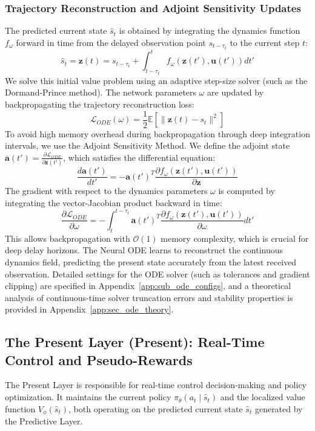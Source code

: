\documentclass[manuscript, screen, review]{jair}
\begin{document}
\subsubsection{Trajectory Reconstruction and Adjoint Sensitivity Updates}
The predicted current state $\hat{s}_t$ is obtained by integrating the dynamics function $f_\omega$ forward in time from the delayed observation point $s_{t-\tau_t}$ to the current step $t$:
\begin{equation}
    \hat{s}_t = \mathbf{z}(t) = s_{t-\tau_t} + \int_{t-\tau_t}^{t} f_\omega(\mathbf{z}(t'), \mathbf{u}(t')) dt'
\end{equation}
We solve this initial value problem using an adaptive step-size solver (such as the Dormand-Prince method). The network parameters $\omega$ are updated by backpropagating the trajectory reconstruction loss:
\begin{equation}
    \mathcal{L}_{ODE}(\omega) = \frac{1}{2} \mathbb{E} \left[ \| \mathbf{z}(t) - s_t \|^2 \right]
\end{equation}
To avoid high memory overhead during backpropagation through deep integration intervals, we use the Adjoint Sensitivity Method. We define the adjoint state $\mathbf{a}(t') = \frac{\partial \mathcal{L}_{ODE}}{\partial \mathbf{z}(t')}$, which satisfies the differential equation:
\begin{equation}
    \frac{d\mathbf{a}(t')}{dt'} = - \mathbf{a}(t')^T \frac{\partial f_\omega(\mathbf{z}(t'), \mathbf{u}(t'))}{\partial \mathbf{z}}
\end{equation}
The gradient with respect to the dynamics parameters $\omega$ is computed by integrating the vector-Jacobian product backward in time:
\begin{equation}
    \frac{\partial \mathcal{L}_{ODE}}{\partial \omega} = - \int_{t}^{t-\tau_t} \mathbf{a}(t')^T \frac{\partial f_\omega(\mathbf{z}(t'), \mathbf{u}(t'))}{\partial \omega} dt'
\end{equation}
This allows backpropagation with $\mathcal{O}(1)$ memory complexity, which is crucial for deep delay horizons. The Neural ODE learns to reconstruct the continuous dynamics field, predicting the present state accurately from the latest received observation. Detailed settings for the ODE solver (such as tolerances and gradient clipping) are specified in Appendix~\ref{app:sub_ode_configs}, and a theoretical analysis of continuous-time solver truncation errors and stability properties is provided in Appendix~\ref{app:sec_ode_theory}.

\subsection{The Present Layer (Present): Real-Time Control and Pseudo-Rewards}
The Present Layer is responsible for real-time control decision-making and policy optimization. It maintains the current policy $\pi_\theta(a_t \mid \hat{s}_t)$ and the localized value function $V_\phi(\hat{s}_t)$, both operating on the predicted current state $\hat{s}_t$ generated by the Predictive Layer.
\end{document}

